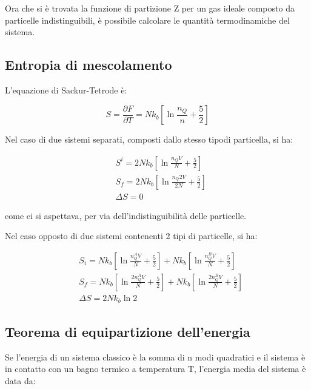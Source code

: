 \documentclass{article}
\begin{document}
Ora che si è trovata la funzione di partizione Z per un gas ideale composto da particelle indistinguibili, è possibile calcolare
le quantità termodinamiche del sistema.

\subsection{Entropia di mescolamento}

L'equazione di Sackur-Tetrode è:

\begin{equation}
    S=\frac{\partial F}{\partial T}=Nk_b\left[\ln{\frac{n_Q}{n}}+\frac{5}{2}\right]
\end{equation}


Nel caso di due sistemi separati, composti dallo stesso tipodi particella, si ha:

\begin{equation}
    \begin{aligned}
         & S^i=2Nk_b\left[\ln{\frac{n_QV}{N}}+\frac{5}{2}\right]   \\
         & S_f=2Nk_b\left[\ln{\frac{n_Q2V}{2N}}+\frac{5}{2}\right] \\
         & \Delta S=0
    \end{aligned}
\end{equation}

come ci si aspettava, per via dell'indistinguibilità delle particelle.

Nel caso opposto di due sistemi contenenti 2 tipi di particelle, si ha:

\begin{equation}
    \begin{aligned}
         & S_i=Nk_b\left[\ln{\frac{n_Q^AV}{N}}+\frac{5}{2}\right]+Nk_b\left[\ln{\frac{n_Q^BV}{N}}+\frac{5}{2}\right]    \\
         & S_f= Nk_b\left[\ln{\frac{2n_Q^AV}{N}}+\frac{5}{2}\right]+Nk_b\left[\ln{\frac{2n_Q^BV}{N}}+\frac{5}{2}\right] \\
         & \Delta S=2Nk_b\ln{2}
    \end{aligned}
\end{equation}


\subsection{Teorema di equipartizione dell'energia}

Se l'energia di un sistema classico è la somma di n modi quadratici e il sistema è in contatto con un bagno termico a temperatura T,
l'energia media del sistema è data da:
\end{document}
